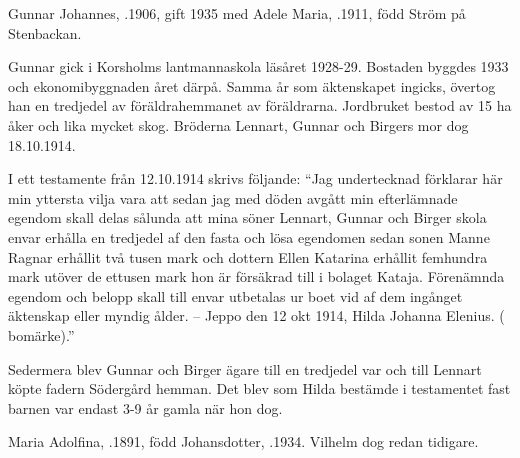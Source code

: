 
%
Gunnar Johannes, .1906, gift 1935 med Adele Maria, .1911, född Ström på Stenbackan.
\begin{jhchildren}
  \item {}
  \item {}
  \item {}
  \item {}
\end{jhchildren}
Gunnar gick i Korsholms lantmannaskola läsåret 1928-29. Bostaden byggdes 1933 och ekonomibyggnaden året därpå. Samma år som äktenskapet ingicks, övertog han en tredjedel av föräldrahemmanet av föräldrarna. Jordbruket bestod av 15 ha åker och lika mycket skog. Bröderna Lennart, Gunnar och Birgers mor dog 18.10.1914.

I ett testamente från 12.10.1914 skrivs följande: ``Jag undertecknad förklarar här min yttersta vilja vara att sedan jag 	med döden avgått min efterlämnade egendom skall delas sålunda att mina söner Lennart, Gunnar och Birger skola envar erhålla en tredjedel af den fasta och lösa egendomen sedan sonen Manne Ragnar erhållit två tusen mark och dottern Ellen Katarina erhållit femhundra mark utöver de ettusen mark hon är försäkrad till i bolaget Kataja. Förenämnda egendom och belopp skall till envar utbetalas ur boet vid af dem ingånget äktenskap eller myndig ålder. -- Jeppo den 12 okt 1914, Hilda Johanna Elenius. ( bomärke).''

Sedermera blev Gunnar och Birger ägare till en tredjedel var och till Lennart köpte fadern Södergård hemman. Det blev som Hilda bestämde i testamentet fast barnen var endast 3-9 år gamla när hon dog.



%


%
Maria Adolfina, .1891, född Johansdotter, .1934.	Vilhelm dog redan tidigare.


